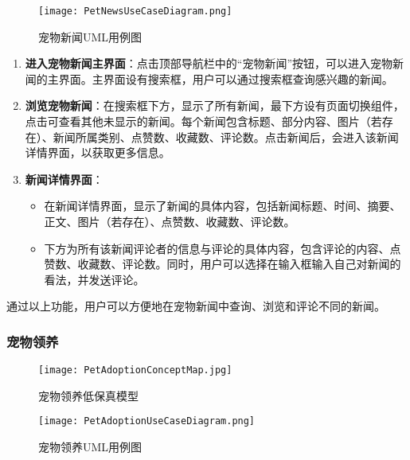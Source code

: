 \begin{figure}[H]
	\centering
	\texttt{[image: PetNewsUseCaseDiagram.png]}
	\caption{宠物新闻UML用例图}
	\label{UserInterfaceConceptMap}
\end{figure}

\begin{enumerate}
	\item \textbf{进入宠物新闻主界面}：点击顶部导航栏中的“宠物新闻”按钮，可以进入宠物新闻的主界面。主界面设有搜索框，用户可以通过搜索框查询感兴趣的新闻。
	\item \textbf{浏览宠物新闻}：在搜索框下方，显示了所有新闻，最下方设有页面切换组件，点击可查看其他未显示的新闻。每个新闻包含标题、部分内容、图片（若存在）、新闻所属类别、点赞数、收藏数、评论数。点击新闻后，会进入该新闻详情界面，以获取更多信息。
	\item \textbf{新闻详情界面}：
	\begin{itemize}
		\item 在新闻详情界面，显示了新闻的具体内容，包括新闻标题、时间、摘要、正文、图片（若存在）、点赞数、收藏数、评论数。
		\item 下方为所有该新闻评论者的信息与评论的具体内容，包含评论的内容、点赞数、收藏数、评论数。同时，用户可以选择在输入框输入自己对新闻的看法，并发送评论。
	\end{itemize}
\end{enumerate}

通过以上功能，用户可以方便地在宠物新闻中查询、浏览和评论不同的新闻。

\subsubsection{宠物领养}

\begin{figure}[H]
	\centering
	\texttt{[image: PetAdoptionConceptMap.jpg]}
	\caption{宠物领养低保真模型}
	\label{PetAdoptionConceptMap}
\end{figure}

\begin{figure}[H]
	\centering
	\texttt{[image: PetAdoptionUseCaseDiagram.png]}
	\caption{宠物领养UML用例图}
	\label{UserInterfaceConceptMap}
\end{figure}

